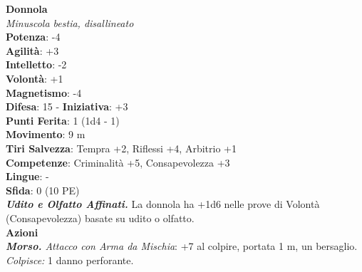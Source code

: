 \begin{multicols}{2}
\medskip\textbf{Donnola}\\
\emph{Minuscola bestia, disallineato}\\
\textbf{Potenza}: -4\\
\textbf{Agilità}: +3\\
\textbf{Intelletto}: -2\\
\textbf{Volontà}: +1\\
\textbf{Magnetismo}: -4\\
\textbf{Difesa}: 15 - \textbf{Iniziativa}: +3\\
\textbf{Punti Ferita}: 1 (1d4 - 1)\\
\textbf{Movimento}: 9 m\\
\textbf{Tiri Salvezza}: Tempra +2, Riflessi +4, Arbitrio +1\\
\textbf{Competenze}: Criminalità +5, Consapevolezza +3\\
\textbf{Lingue}: -\\
\textbf{Sfida}: 0 (10 PE)\smallskip\\
\emph{\textbf{Udito e Olfatto Affinati.}} La donnola ha +1d6 nelle prove di Volontà (Consapevolezza) basate su udito o olfatto.\\
\smallskip\textbf{Azioni}\\
\emph{\textbf{Morso.} Attacco con Arma da Mischia}: +7 al colpire, portata 1 m, un bersaglio.\\
\emph{Colpisce:} 1 danno perforante.\\



\end{multicols}
